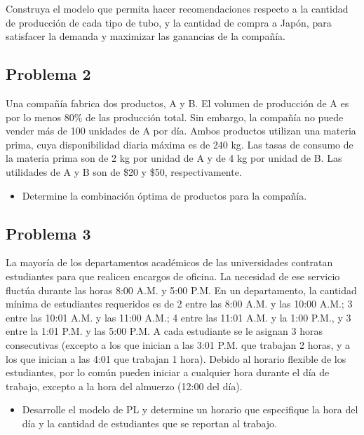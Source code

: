 \documentclass[letterpaper]{article}
\begin{document}
Construya el modelo que permita hacer recomendaciones respecto a la cantidad de producción de cada tipo de tubo, y la cantidad de compra a Japón, para satisfacer la demanda y maximizar las ganancias de la compañía.

\subsection*{Problema 2}
Una compañía fabrica dos productos, A y B. El volumen de producción de A es por lo menos 80\% de las producción total. Sin embargo, la compañía no puede vender más de 100 unidades de A por día. Ambos productos utilizan una materia prima, cuya disponibilidad diaria máxima es de 240 kg. Las tasas de consumo de la materia prima son de 2 kg por unidad de A y de 4 kg por unidad de B. Las utilidades de A y B son de \$20 y \$50, respectivamente. 

\begin{itemize}
\item Determine la combinación óptima de productos para la compañía.
\end{itemize}

\subsection*{Problema 3}
La mayoría de los departamentos académicos de las universidades contratan estudiantes para que realicen encargos de oficina. La necesidad de ese servicio fluctúa durante las horas 8:00 A.M. y 5:00 P.M. En un departamento, la cantidad mínima de estudiantes requeridos es de 2 entre las 8:00 A.M. y las 10:00 A.M.; 3 entre las 10:01 A.M. y las 11:00 A.M.; 4 entre las 11:01 A.M. y la 1:00 P.M., y 3 entre la 1:01 P.M. y las 5:00 P.M. A cada estudiante se le asignan 3 horas consecutivas (excepto a los que inician a las 3:01 P.M. que trabajan 2 horas, y a los que inician a las 4:01 que trabajan 1 hora). Debido al horario flexible de los estudiantes, por lo común pueden iniciar a cualquier hora durante el día de trabajo, excepto a la hora del almuerzo (12:00 del día). 

\begin{itemize}
\item Desarrolle el modelo de PL y determine un horario que especifique la hora del día y la cantidad de estudiantes que se reportan al trabajo.
\end{itemize}
\end{document}
